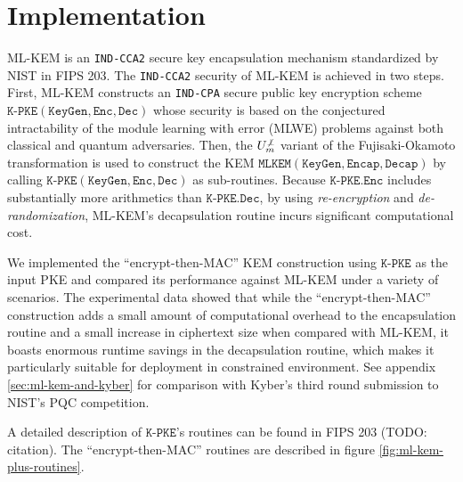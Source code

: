 \documentclass[journal=tches,submission]{iacrtrans}
\newcommand{\keygen}{\texttt{KeyGen}}
\newcommand{\encrypt}{\texttt{Enc}}
\newcommand{\decrypt}{\texttt{Dec}}
\newcommand{\encap}{\texttt{Encap}}
\newcommand{\decap}{\texttt{Decap}}
\begin{document}
\section{Implementation}\label{sec:implementation}
ML-KEM is an \texttt{IND-CCA2} secure key encapsulation mechanism standardized by NIST in FIPS 203. The \texttt{IND-CCA2} security of ML-KEM is achieved in two steps. First, ML-KEM constructs an \texttt{IND-CPA} secure public key encryption scheme $\texttt{K-PKE}(\keygen, \encrypt, \decrypt)$ whose security is based on the conjectured intractability of the module learning with error (MLWE) problems against both classical and quantum adversaries. Then, the $U^{\not\bot}_m$ variant of the Fujisaki-Okamoto transformation \cite{hofheinz2017modular} is used to construct the KEM $\texttt{MLKEM}(\keygen, \encap, \decap)$ by calling $\texttt{K-PKE}(\keygen, \encrypt, \decrypt)$ as sub-routines. Because $\texttt{K-PKE}.\encrypt$ includes substantially more arithmetics than $\texttt{K-PKE}.\decrypt$, by using \textit{re-encryption} and \textit{de-randomization}, ML-KEM's decapsulation routine incurs significant computational cost. 

We implemented the ``encrypt-then-MAC'' KEM construction using $\texttt{K-PKE}$ as the input PKE and compared its performance against ML-KEM under a variety of scenarios. The experimental data showed that while the ``encrypt-then-MAC'' construction adds a small amount of computational overhead to the encapsulation routine and a small increase in ciphertext size when compared with ML-KEM, it boasts enormous runtime savings in the decapsulation routine, which makes it particularly suitable for deployment in constrained environment. See appendix \ref{sec:ml-kem-and-kyber} for comparison with Kyber's third round submission to NIST's PQC competition.

A detailed description of $\texttt{K-PKE}$'s routines can be found in FIPS 203 (TODO: citation). The ``encrypt-then-MAC'' routines are described in figure \ref{fig:ml-kem-plus-routines}.
\end{document}
